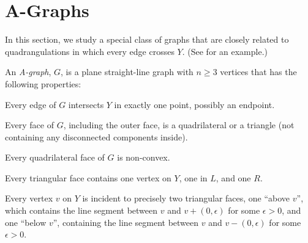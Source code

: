 \section{A-Graphs}

In this section, we study a special class of graphs that are closely
related to quadrangulations in which every edge crosses $Y$. (See  for an example.)

\begin{defn}
	An \emph{A-graph}, $G$, is a plane straight-line graph with $n\ge 3$ vertices that has the following properties:
	\begin{compactenum}
		\item Every edge of $G$ intersects $Y$ in exactly one point, possibly an endpoint.
		\item Every face of $G$, including the outer face, is
                  a quadrilateral or a triangle (not containing any
                  disconnected components inside).
		\item Every quadrilateral face of $G$ is non-convex.
		\item Every triangular face contains one vertex
 on $Y$, one in $L$, and one $R$.  
		\item Every vertex $v$ on $Y$ is incident to precisely
		two triangular faces, one ``above $v$'', which
                contains the line segment between $v$ and
                $v+(0,\epsilon)$ for some $\epsilon>0$, and one ``below
                $v$'', containing the line segment between $v$ and $v-(0,\epsilon)$ for some $\epsilon >0$.
	\end{compactenum}
\end{defn}

